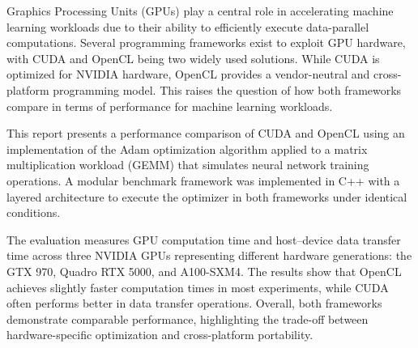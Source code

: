 Graphics Processing Units (GPUs) play a central role in accelerating machine learning workloads due to their ability to efficiently execute data-parallel computations. Several programming frameworks exist to exploit GPU hardware, with CUDA and OpenCL being two widely used solutions. While CUDA is optimized for NVIDIA hardware, OpenCL provides a vendor-neutral and cross-platform programming model. This raises the question of how both frameworks compare in terms of performance for machine learning workloads.

This report presents a performance comparison of CUDA and OpenCL using an implementation of the Adam optimization algorithm applied to a matrix multiplication workload (GEMM) that simulates neural network training operations. A modular benchmark framework was implemented in C++ with a layered architecture to execute the optimizer in both frameworks under identical conditions.

The evaluation measures GPU computation time and host–device data transfer time across three NVIDIA GPUs representing different hardware generations: the GTX 970, Quadro RTX 5000, and A100-SXM4. The results show that OpenCL achieves slightly faster computation times in most experiments, while CUDA often performs better in data transfer operations. Overall, both frameworks demonstrate comparable performance, highlighting the trade-off between hardware-specific optimization and cross-platform portability.